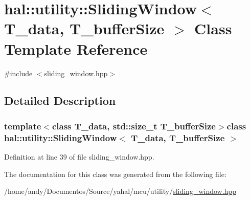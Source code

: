 \hypertarget{classhal_1_1utility_1_1_sliding_window}{}\section{hal\+:\+:utility\+:\+:Sliding\+Window$<$ T\+\_\+data, T\+\_\+buffer\+Size $>$ Class Template Reference}
\label{classhal_1_1utility_1_1_sliding_window}


{\ttfamily \#include $<$sliding\+\_\+window.\+hpp$>$}



\subsection{Detailed Description}
\subsubsection*{template$<$class T\+\_\+data, std\+::size\+\_\+t T\+\_\+buffer\+Size$>$class hal\+::utility\+::\+Sliding\+Window$<$ T\+\_\+data, T\+\_\+buffer\+Size $>$}



Definition at line 39 of file sliding\+\_\+window.\+hpp.



The documentation for this class was generated from the following file\+:\begin{DoxyCompactItemize}
\item 
/home/andy/\+Documentos/\+Source/yahal/mcu/utility/\hyperlink{sliding__window_8hpp}{sliding\+\_\+window.\+hpp}\end{DoxyCompactItemize}
